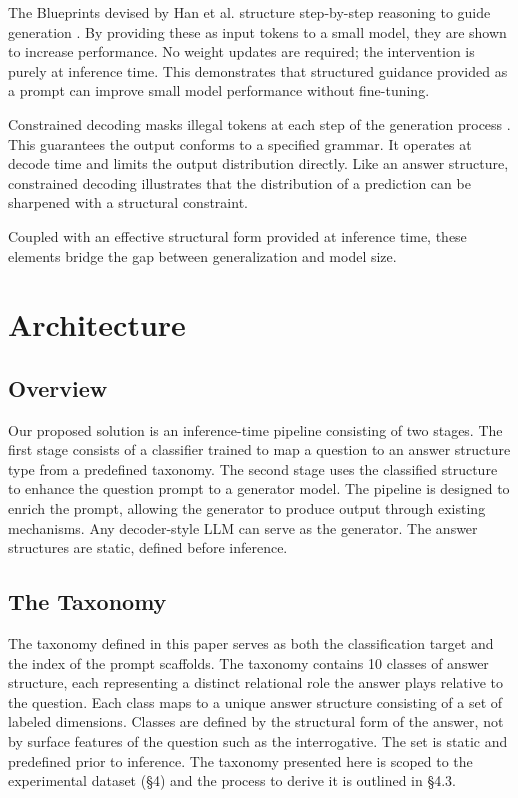 \documentclass{article}
\begin{document}
The Blueprints devised by Han et al. structure step-by-step reasoning to guide generation \cite{han2025blueprints}. By providing these as input tokens to a small model, they are shown to increase performance. No weight updates are required; the intervention is purely at inference time. This demonstrates that structured guidance provided as a prompt can improve small model performance without fine-tuning.

Constrained decoding masks illegal tokens at each step of the generation process \cite{willard2023guided}. This guarantees the output conforms to a specified grammar. It operates at decode time and limits the output distribution directly. Like an answer structure, constrained decoding illustrates that the distribution of a prediction can be sharpened with a structural constraint.

Coupled with an effective structural form provided at inference time, these elements bridge the gap between generalization and model size.

\section{Architecture}

\subsection{Overview}

Our proposed solution is an inference-time pipeline consisting of two stages. The first stage consists of a classifier trained to map a question to an answer structure type from a predefined taxonomy. The second stage uses the classified structure to enhance the question prompt to a generator model. The pipeline is designed to enrich the prompt, allowing the generator to produce output through existing mechanisms. Any decoder-style LLM can serve as the generator. The answer structures are static, defined before inference.

\subsection{The Taxonomy}

The taxonomy defined in this paper serves as both the classification target and the index of the prompt scaffolds. The taxonomy contains 10 classes of answer structure, each representing a distinct relational role the answer plays relative to the question. Each class maps to a unique answer structure consisting of a set of labeled dimensions. Classes are defined by the structural form of the answer, not by surface features of the question such as the interrogative. The set is static and predefined prior to inference. The taxonomy presented here is scoped to the experimental dataset (\S4) and the process to derive it is outlined in \S4.3.
\end{document}
